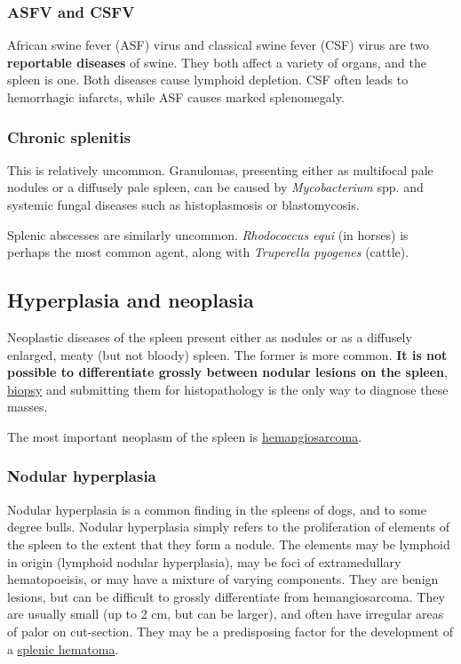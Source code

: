 \documentclass[openany]{article}
\begin{document}
\subsubsection{ASFV and CSFV}\label{asfv-and-csfv}

African swine fever (ASF) virus and classical swine fever (CSF) virus
are two \textbf{reportable diseases} of swine. They both affect a
variety of organs, and the spleen is one. Both diseases cause lymphoid
depletion. CSF often leads to hemorrhagic infarcts, while ASF causes
marked splenomegaly.

\subsubsection{Chronic splenitis}\label{chronic-splenitis}

This is relatively uncommon. Granulomas, presenting either as multifocal
pale nodules or a diffusely pale spleen, can be caused by
\emph{Mycobacterium} spp. and systemic fungal diseases such as
histoplasmosis or blastomycosis.

Splenic abscesses are similarly uncommon. \emph{Rhodococcus equi} (in
horses) is perhaps the most common agent, along with \emph{Truperella
pyogenes} (cattle).

\subsection{Hyperplasia and neoplasia}\label{hyperplasia-and-neoplasia}

Neoplastic diseases of the spleen present either as nodules or as a
diffusely enlarged, meaty (but not bloody) spleen. The former is more
common. \textbf{It is not possible to differentiate grossly between
nodular lesions on the spleen},
\protect\hyperlink{biopsying-the-spleen}{biopsy} and submitting them for
histopathology is the only way to diagnose these masses.

The most important neoplasm of the spleen is
\protect\hyperlink{hemangiosarcoma}{hemangiosarcoma}.

\hypertarget{nodular-hyperplasia}{\subsubsection{Nodular
hyperplasia}\label{nodular-hyperplasia}}

Nodular hyperplasia is a common finding in the spleens of dogs, and to
some degree bulls. Nodular hyperplasia simply refers to the
proliferation of elements of the spleen to the extent that they form a
nodule. The elements may be lymphoid in origin (lymphoid nodular
hyperplasia), may be foci of extramedullary hematopoeisis, or may have a
mixture of varying components. They are benign lesions, but can be
difficult to grossly differentiate from hemangiosarcoma. They are
usually small (up to 2 cm, but can be larger), and often have irregular
areas of palor on cut-section. They may be a predisposing factor for the
development of a \protect\hyperlink{hematoma}{splenic hematoma}.
\end{document}
